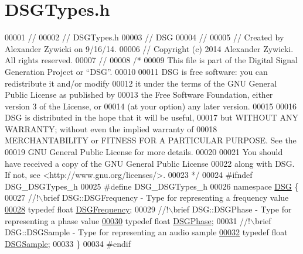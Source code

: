 \hypertarget{_d_s_g_types_8h_source}{\section{D\+S\+G\+Types.\+h}
\label{_d_s_g_types_8h_source}
}

\begin{DoxyCode}
00001 \textcolor{comment}{//}
00002 \textcolor{comment}{//  DSGTypes.h}
00003 \textcolor{comment}{//  DSG}
00004 \textcolor{comment}{//}
00005 \textcolor{comment}{//  Created by Alexander Zywicki on 9/16/14.}
00006 \textcolor{comment}{//  Copyright (c) 2014 Alexander Zywicki. All rights reserved.}
00007 \textcolor{comment}{//}
00008 \textcolor{comment}{/*}
00009 \textcolor{comment}{ This file is part of the Digital Signal Generation Project or “DSG”.}
00010 \textcolor{comment}{}
00011 \textcolor{comment}{ DSG is free software: you can redistribute it and/or modify}
00012 \textcolor{comment}{ it under the terms of the GNU General Public License as published by}
00013 \textcolor{comment}{ the Free Software Foundation, either version 3 of the License, or}
00014 \textcolor{comment}{ (at your option) any later version.}
00015 \textcolor{comment}{}
00016 \textcolor{comment}{ DSG is distributed in the hope that it will be useful,}
00017 \textcolor{comment}{ but WITHOUT ANY WARRANTY; without even the implied warranty of}
00018 \textcolor{comment}{ MERCHANTABILITY or FITNESS FOR A PARTICULAR PURPOSE.  See the}
00019 \textcolor{comment}{ GNU General Public License for more details.}
00020 \textcolor{comment}{}
00021 \textcolor{comment}{ You should have received a copy of the GNU General Public License}
00022 \textcolor{comment}{ along with DSG.  If not, see <http://www.gnu.org/licenses/>.}
00023 \textcolor{comment}{ */}
00024 \textcolor{preprocessor}{#ifndef DSG\_DSGTypes\_h}
00025 \textcolor{preprocessor}{#define DSG\_DSGTypes\_h}
00026 \textcolor{keyword}{namespace }\hyperlink{namespace_d_s_g}{DSG} \{\textcolor{comment}{}
00027 \textcolor{comment}{    //!\(\backslash\)brief DSG::DSGFrequency - Type for representing a frequency value}
\hypertarget{_d_s_g_types_8h_source_l00028}{}\hyperlink{namespace_d_s_g_a4315a061386fa1014fda09b15d3a6973}{00028} \textcolor{comment}{}    \textcolor{keyword}{typedef} \textcolor{keywordtype}{float} \hyperlink{namespace_d_s_g_a4315a061386fa1014fda09b15d3a6973}{DSGFrequency};\textcolor{comment}{}
00029 \textcolor{comment}{    //!\(\backslash\)brief DSG::DSGPhase - Type for representing a phase value}
\hypertarget{_d_s_g_types_8h_source_l00030}{}\hyperlink{namespace_d_s_g_a44431ce1eb0a7300efdd207bc879e52c}{00030} \textcolor{comment}{}    \textcolor{keyword}{typedef} \textcolor{keywordtype}{float} \hyperlink{namespace_d_s_g_a44431ce1eb0a7300efdd207bc879e52c}{DSGPhase};\textcolor{comment}{}
00031 \textcolor{comment}{    //!\(\backslash\)brief DSG::DSGSample - Type for representing an audio sample}
\hypertarget{_d_s_g_types_8h_source_l00032}{}\hyperlink{namespace_d_s_g_ac39a94cd27ebcd9c1e7502d0c624894a}{00032} \textcolor{comment}{}    \textcolor{keyword}{typedef} \textcolor{keywordtype}{float} \hyperlink{namespace_d_s_g_ac39a94cd27ebcd9c1e7502d0c624894a}{DSGSample};
00033 \}
00034 \textcolor{preprocessor}{#endif}
\end{DoxyCode}
